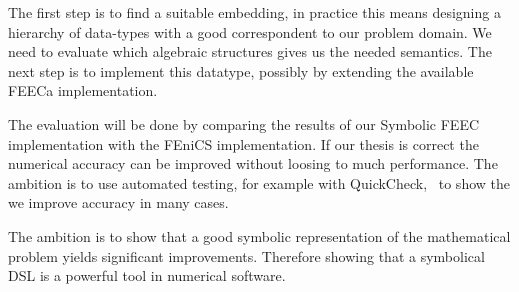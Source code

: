 \documentclass{scrartcl}
\begin{document}
The first step is to find a suitable embedding, in practice this means
designing a hierarchy of data-types with a good correspondent to our problem
domain.  We need to evaluate which algebraic structures gives us the needed
semantics. The next step is to implement this datatype, possibly by extending
the available FEECa implementation.

The evaluation will be done by comparing the results of our Symbolic FEEC
implementation with the FEniCS implementation. If our thesis is correct the
numerical accuracy can be improved without loosing to much performance.
The ambition is to use automated testing, for example with
QuickCheck,~\cite{claessen_quickcheck_2000} to show the we improve accuracy in
many cases.


The ambition is to show that a good symbolic representation of the mathematical
problem yields significant improvements. Therefore showing that a symbolical DSL
is a powerful tool in numerical software.




\end{document}

